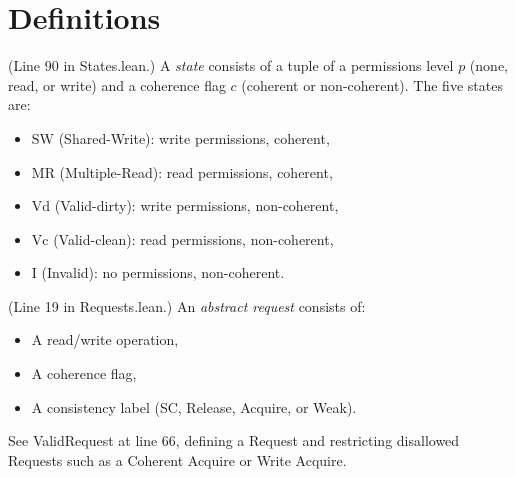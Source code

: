 \section{Definitions}
\label{sec:defs}

\begin{definition}
  \label{def:State}
  \leanok
  (Line 90 in States.lean.)
  A \emph{state} consists of a tuple of a permissions level $p$ (none, read, or write)
  and a coherence flag $c$ (coherent or non-coherent).
  The five states are:
  \begin{itemize}
    \item $\mathrm{SW}$ (Shared-Write): write permissions, coherent,
    \item $\mathrm{MR}$ (Multiple-Read): read permissions, coherent,
    \item $\mathrm{Vd}$ (Valid-dirty): write permissions, non-coherent,
    \item $\mathrm{Vc}$ (Valid-clean): read permissions, non-coherent,
    \item $\mathrm{I}$ (Invalid): no permissions, non-coherent.
  \end{itemize}
\end{definition}

\begin{definition}
  \label{def:Request}
  \leanok
  (Line 19 in Requests.lean.)
  An \emph{abstract request} consists of:
  \begin{itemize}
    \item A read/write operation,
    \item A coherence flag,
    \item A consistency label (SC, Release, Acquire, or Weak).
  \end{itemize}
  See ValidRequest at line 66, defining a Request and restricting disallowed
  Requests such as a Coherent Acquire or Write Acquire.
\end{definition}

